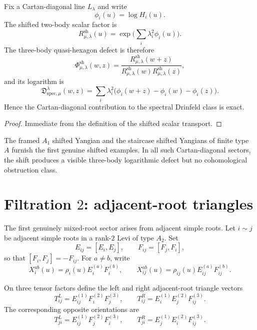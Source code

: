 \begin{theorem}
\label{thm:cartan-diagonal-defect-exact}
Fix a Cartan-diagonal line $L_\lambda$ and write
\[
\phi_i(u)=\log H_i(u).
\]
The shifted two-body scalar factor is
\[
R_{\mu,\lambda}^{\mathrm{sh}}(u)=
\exp\!\Big(\sum_i \lambda_i^2\phi_i(u)\Big).
\]
The three-body quasi-hexagon defect is therefore
\[
\Phi_{\mu,\lambda}^{\mathrm{sh}}(w,z)=
\frac{R_{\mu,\lambda}^{\mathrm{sh}}(w+z)}{R_{\mu,\lambda}^{\mathrm{sh}}(w)
R_{\mu,\lambda}^{\mathrm{sh}}(z)},
\]
and its logarithm is
\[
\mathfrak D_{\mathrm{spec},\mu}^{\lambda}(w,z)=
\sum_i \lambda_i^2\big(\phi_i(w+z)-\phi_i(w)-\phi_i(z)\big).
\]
Hence the Cartan-diagonal contribution to the spectral Drinfeld class is
exact.
\end{theorem}

\begin{proof}
Immediate from the definition of the shifted scalar transport.
\end{proof}

\begin{remark}
The framed $A_1$ shifted Yangian and the staircase shifted Yangians of
finite type~$A$ furnish the first genuine shifted examples. In all such
Cartan-diagonal sectors, the shift produces a visible three-body
logarithmic defect but no cohomological obstruction class.
\end{remark}

\section{Filtration $2$: adjacent-root triangles}

The first genuinely mixed-root sector arises from adjacent simple roots.
Let $i\sim j$ be adjacent simple roots in a rank-$2$ Levi of type $A_2$.
Set
\[
E_{ij}=[E_i,E_j],
\qquad
F_{ij}=[F_j,F_i],
\]
so that $[F_i,F_j]=-F_{ij}$.
For $a\neq b$, write
\[
X_i^{ab}(u)=\rho_i(u)E_i^{(a)}F_i^{(b)},
\qquad
X_{ij}^{ab}(u)=\rho_{ij}(u)E_{ij}^{(a)}F_{ij}^{(b)}.
\]

\begin{definition}
On three tensor factors define the left and right adjacent-root triangle
vectors
\[
T_{ij}^{L}=E_{ij}^{(1)}F_i^{(2)}F_j^{(3)},
\qquad
T_{ij}^{R}=E_i^{(1)}E_j^{(2)}F_{ij}^{(3)}.
\]
The corresponding opposite orientations are
\[
T_{ji}^{L}=E_{ij}^{(1)}F_j^{(2)}F_i^{(3)},
\qquad
T_{ji}^{R}=E_j^{(1)}E_i^{(2)}F_{ij}^{(3)}.
\]
\end{definition}

